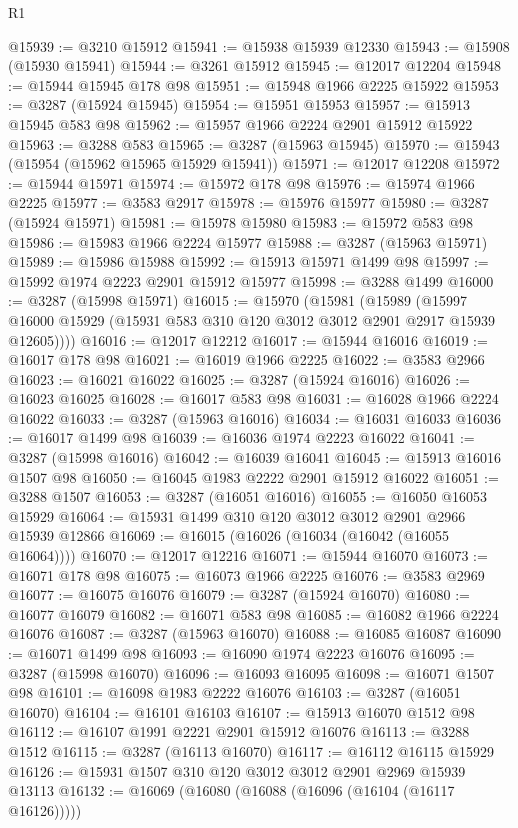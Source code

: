 \begin{lexlean}{R1}
\begin{coremodule}
@15939 := @3210 @15912
@15941 := @15938 @15939 @12330
@15943 := @15908 (@15930 @15941)
@15944 := @3261 @15912
@15945 := @12017 @12204
@15948 := @15944 @15945 @178 @98
@15951 := @15948 @1966 @2225 @15922
@15953 := @3287 (@15924 @15945)
@15954 := @15951 @15953
@15957 := @15913 @15945 @583 @98
@15962 := @15957 @1966 @2224 @2901 @15912 @15922
@15963 := @3288 @583
@15965 := @3287 (@15963 @15945)
@15970 := @15943 (@15954 (@15962 @15965 @15929 @15941))
@15971 := @12017 @12208
@15972 := @15944 @15971
@15974 := @15972 @178 @98
@15976 := @15974 @1966 @2225
@15977 := @3583 @2917
@15978 := @15976 @15977
@15980 := @3287 (@15924 @15971)
@15981 := @15978 @15980
@15983 := @15972 @583 @98
@15986 := @15983 @1966 @2224 @15977
@15988 := @3287 (@15963 @15971)
@15989 := @15986 @15988
@15992 := @15913 @15971 @1499 @98
@15997 := @15992 @1974 @2223 @2901 @15912 @15977
@15998 := @3288 @1499
@16000 := @3287 (@15998 @15971)
@16015 := @15970
    (@15981
      (@15989 (@15997 @16000 @15929 (@15931 @583 @310 @120 @3012 @3012 @2901 @2917 @15939 @12605))))
@16016 := @12017 @12212
@16017 := @15944 @16016
@16019 := @16017 @178 @98
@16021 := @16019 @1966 @2225
@16022 := @3583 @2966
@16023 := @16021 @16022
@16025 := @3287 (@15924 @16016)
@16026 := @16023 @16025
@16028 := @16017 @583 @98
@16031 := @16028 @1966 @2224 @16022
@16033 := @3287 (@15963 @16016)
@16034 := @16031 @16033
@16036 := @16017 @1499 @98
@16039 := @16036 @1974 @2223 @16022
@16041 := @3287 (@15998 @16016)
@16042 := @16039 @16041
@16045 := @15913 @16016 @1507 @98
@16050 := @16045 @1983 @2222 @2901 @15912 @16022
@16051 := @3288 @1507
@16053 := @3287 (@16051 @16016)
@16055 := @16050 @16053 @15929
@16064 := @15931 @1499 @310 @120 @3012 @3012 @2901 @2966 @15939 @12866
@16069 := @16015 (@16026 (@16034 (@16042 (@16055 @16064))))
@16070 := @12017 @12216
@16071 := @15944 @16070
@16073 := @16071 @178 @98
@16075 := @16073 @1966 @2225
@16076 := @3583 @2969
@16077 := @16075 @16076
@16079 := @3287 (@15924 @16070)
@16080 := @16077 @16079
@16082 := @16071 @583 @98
@16085 := @16082 @1966 @2224 @16076
@16087 := @3287 (@15963 @16070)
@16088 := @16085 @16087
@16090 := @16071 @1499 @98
@16093 := @16090 @1974 @2223 @16076
@16095 := @3287 (@15998 @16070)
@16096 := @16093 @16095
@16098 := @16071 @1507 @98
@16101 := @16098 @1983 @2222 @16076
@16103 := @3287 (@16051 @16070)
@16104 := @16101 @16103
@16107 := @15913 @16070 @1512 @98
@16112 := @16107 @1991 @2221 @2901 @15912 @16076
@16113 := @3288 @1512
@16115 := @3287 (@16113 @16070)
@16117 := @16112 @16115 @15929
@16126 := @15931 @1507 @310 @120 @3012 @3012 @2901 @2969 @15939 @13113
@16132 := @16069 (@16080 (@16088 (@16096 (@16104 (@16117 @16126)))))

\end{coremodule}
\end{lexlean}
